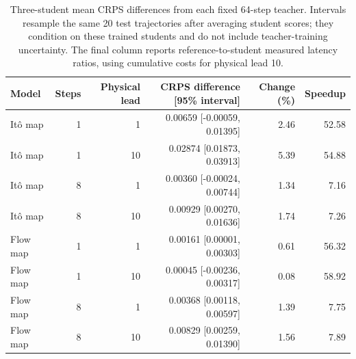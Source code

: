 \begin{table}[t]
\caption{Three-student mean CRPS differences from each fixed 64-step teacher. Intervals resample the same 20 test trajectories after averaging student scores; they condition on these trained students and do not include teacher-training uncertainty. The final column reports reference-to-student measured latency ratios, using cumulative costs for physical lead 10.}
\label{tab:replication-paired}
\centering
\begin{tabular}{lrrrrr}
\toprule
Model & Steps & Physical lead & CRPS difference [95\% interval] & Change (\%) & Speedup \\
\midrule
It\^o map & 1 & 1 & 0.00659 [-0.00059, 0.01395] & 2.46 & 52.58\\
It\^o map & 1 & 10 & 0.02874 [0.01873, 0.03913] & 5.39 & 54.88\\
It\^o map & 8 & 1 & 0.00360 [-0.00024, 0.00744] & 1.34 & 7.16\\
It\^o map & 8 & 10 & 0.00929 [0.00270, 0.01636] & 1.74 & 7.26\\
Flow map & 1 & 1 & 0.00161 [0.00001, 0.00303] & 0.61 & 56.32\\
Flow map & 1 & 10 & 0.00045 [-0.00236, 0.00317] & 0.08 & 58.92\\
Flow map & 8 & 1 & 0.00368 [0.00118, 0.00597] & 1.39 & 7.75\\
Flow map & 8 & 10 & 0.00829 [0.00259, 0.01390] & 1.56 & 7.89\\
\bottomrule
\end{tabular}
\end{table}
